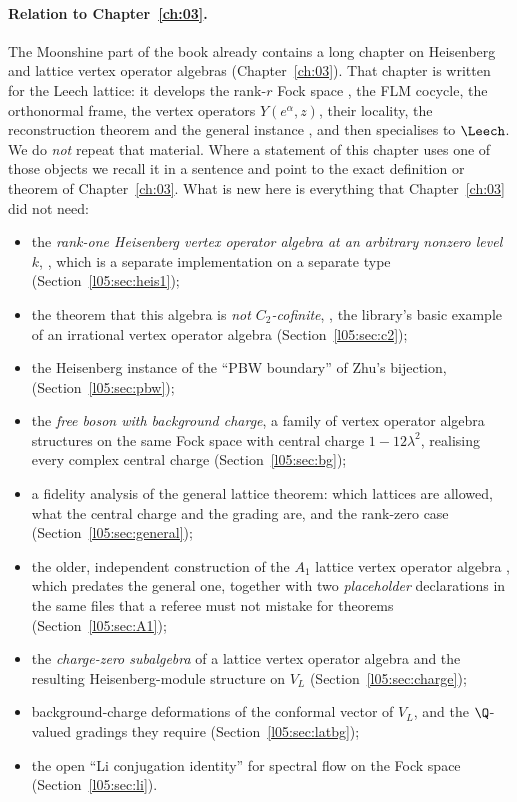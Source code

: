 \paragraph{Relation to Chapter~\ref{ch:03}.} The Moonshine part of the book already contains a long
chapter on Heisenberg and lattice vertex operator algebras (Chapter~\ref{ch:03}). That chapter is
written for the Leech lattice: it develops the rank-$r$ Fock space , the FLM
cocycle, the orthonormal frame, the vertex operators $Y(e^\alpha,z)$, their locality, the
reconstruction theorem and the general instance , and then specialises to
$\Leech$. We do \emph{not} repeat that material. Where a statement of this chapter uses one of those
objects we recall it in a sentence and point to the exact definition or theorem of
Chapter~\ref{ch:03}. What is new here is everything that Chapter~\ref{ch:03} did not need:
\begin{itemize}
\item the \emph{rank-one Heisenberg vertex operator algebra at an arbitrary nonzero level $k$},
  , which is a separate implementation on a separate type
  (Section~\ref{l05:sec:heis1});
\item the theorem that this algebra is \emph{not $C_2$-cofinite}, ,
  the library's basic example of an irrational vertex operator algebra
  (Section~\ref{l05:sec:c2});
\item the Heisenberg instance of the ``PBW boundary'' of Zhu's bijection,
   (Section~\ref{l05:sec:pbw});
\item the \emph{free boson with background charge}, a family of vertex operator algebra structures on
  the same Fock space with central charge $1-12\lambda^2$, realising every complex central charge
  (Section~\ref{l05:sec:bg});
\item a fidelity analysis of the general lattice theorem: which lattices are allowed, what the
  central charge and the grading are, and the rank-zero case (Section~\ref{l05:sec:general});
\item the older, independent construction of the $A_1$ lattice vertex operator algebra
  , which predates the general one, together with two \emph{placeholder}
  declarations in the same files that a referee must not mistake for theorems
  (Section~\ref{l05:sec:A1});
\item the \emph{charge-zero subalgebra}  of a lattice vertex operator algebra and
  the resulting Heisenberg-module structure on $V_L$ (Section~\ref{l05:sec:charge});
\item background-charge deformations of the conformal vector of $V_L$, and the $\Q$-valued gradings
  they require (Section~\ref{l05:sec:latbg});
\item the open ``Li conjugation identity'' for spectral flow on the Fock space
  (Section~\ref{l05:sec:li}).
\end{itemize}


